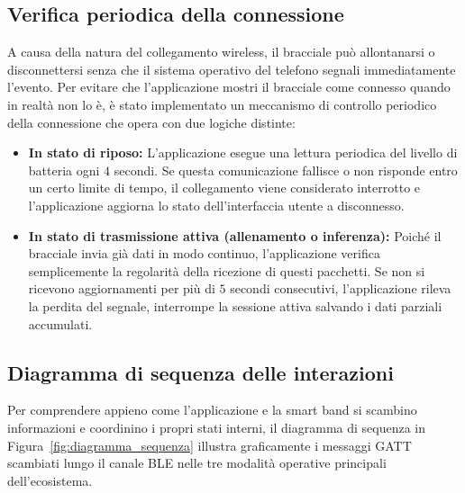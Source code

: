 \subsection{Verifica periodica della connessione}
A causa della natura del collegamento wireless, il bracciale può allontanarsi o disconnettersi senza che il sistema operativo del telefono segnali immediatamente l'evento. Per evitare che l'applicazione mostri il bracciale come connesso quando in realtà non lo è, è stato implementato un meccanismo di controllo periodico della connessione che opera con due logiche distinte:
\begin{itemize}
    \item \textbf{In stato di riposo:} L'applicazione esegue una lettura periodica del livello di batteria ogni $4$ secondi. Se questa comunicazione fallisce o non risponde entro un certo limite di tempo, il collegamento viene considerato interrotto e l'applicazione aggiorna lo stato dell'interfaccia utente a disconnesso.
    \item \textbf{In stato di trasmissione attiva (allenamento o inferenza):} Poiché il bracciale invia già dati in modo continuo, l'applicazione verifica semplicemente la regolarità della ricezione di questi pacchetti. Se non si ricevono aggiornamenti per più di $5$ secondi consecutivi, l'applicazione rileva la perdita del segnale, interrompe la sessione attiva salvando i dati parziali accumulati.
\end{itemize}

\subsection{Diagramma di sequenza delle interazioni}
Per comprendere appieno come l'applicazione e la smart band si scambino informazioni e coordinino i propri stati interni, il diagramma di sequenza in Figura~\ref{fig:diagramma_sequenza} illustra graficamente i messaggi GATT scambiati lungo il canale BLE nelle tre modalità operative principali dell'ecosistema.

